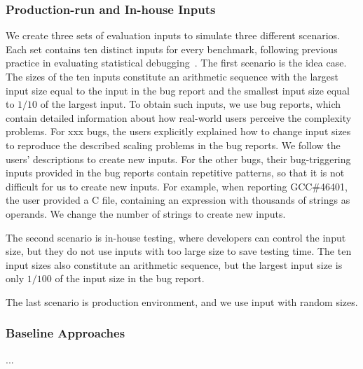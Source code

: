 \subsubsection{Production-run and In-house Inputs}

We create three sets of evaluation inputs to simulate three different scenarios.
Each set contains ten distinct inputs for every benchmark, 
following previous practice in evaluating statistical debugging~\cite{joy.asplos13,SongOOPSLA2014}.
The first scenario is the idea case. The sizes of the ten inputs 
constitute an arithmetic sequence with the largest input size equal 
to the input in the bug report
and the smallest input size equal to $1/10$ of the largest input. 
To obtain such inputs, we use bug reports, 
which contain detailed information about how real-world 
users perceive the complexity problems. 
For {xxx} bugs, 
the users explicitly explained how to change input sizes 
to reproduce the described scaling problems in the bug reports. 
We follow the users' descriptions to create new inputs. 
For the other bugs, their bug-triggering inputs provided 
in the bug reports contain repetitive patterns, 
so that it is not difficult for us to create new inputs.
For example, when reporting GCC\#46401,
the user provided a C file, 
containing an expression with thousands of strings as operands. 
We change the number of strings to create new inputs.

The second scenario is in-house testing, where
developers can control the input size, 
but they do not use inputs with too large size 
to save testing time.  
The ten input sizes also constitute an arithmetic sequence, 
but the largest input size is only $1/100$ of the input size in the bug report. 

The last scenario is production environment, 
and we use input with random sizes. 


\subsubsection{Baseline Approaches}

...


